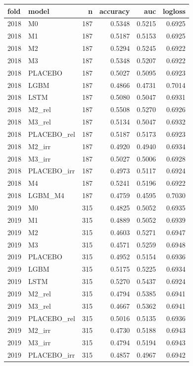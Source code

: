 \begin{tabular}{llrrrr}
\toprule
fold & model & n & accuracy & auc & logloss \\
\midrule
2018 & M0 & 187 & 0.5348 & 0.5215 & 0.6925 \\
2018 & M1 & 187 & 0.5187 & 0.5153 & 0.6925 \\
2018 & M2 & 187 & 0.5294 & 0.5245 & 0.6922 \\
2018 & M3 & 187 & 0.5348 & 0.5207 & 0.6922 \\
2018 & PLACEBO & 187 & 0.5027 & 0.5095 & 0.6923 \\
2018 & LGBM & 187 & 0.4866 & 0.4731 & 0.7014 \\
2018 & LSTM & 187 & 0.5080 & 0.5047 & 0.6931 \\
2018 & M2\_rel & 187 & 0.5508 & 0.5270 & 0.6926 \\
2018 & M3\_rel & 187 & 0.5134 & 0.5047 & 0.6932 \\
2018 & PLACEBO\_rel & 187 & 0.5187 & 0.5173 & 0.6923 \\
2018 & M2\_irr & 187 & 0.4920 & 0.4940 & 0.6934 \\
2018 & M3\_irr & 187 & 0.5027 & 0.5006 & 0.6928 \\
2018 & PLACEBO\_irr & 187 & 0.4973 & 0.5117 & 0.6924 \\
2018 & M4 & 187 & 0.5241 & 0.5196 & 0.6922 \\
2018 & LGBM\_M4 & 187 & 0.4759 & 0.4595 & 0.7030 \\
2019 & M0 & 315 & 0.4825 & 0.5052 & 0.6935 \\
2019 & M1 & 315 & 0.4889 & 0.5052 & 0.6939 \\
2019 & M2 & 315 & 0.4603 & 0.5271 & 0.6947 \\
2019 & M3 & 315 & 0.4571 & 0.5259 & 0.6948 \\
2019 & PLACEBO & 315 & 0.4952 & 0.5154 & 0.6936 \\
2019 & LGBM & 315 & 0.5175 & 0.5225 & 0.6934 \\
2019 & LSTM & 315 & 0.5270 & 0.5437 & 0.6924 \\
2019 & M2\_rel & 315 & 0.4794 & 0.5385 & 0.6941 \\
2019 & M3\_rel & 315 & 0.4667 & 0.5362 & 0.6941 \\
2019 & PLACEBO\_rel & 315 & 0.5016 & 0.5135 & 0.6936 \\
2019 & M2\_irr & 315 & 0.4730 & 0.5188 & 0.6943 \\
2019 & M3\_irr & 315 & 0.4794 & 0.5194 & 0.6943 \\
2019 & PLACEBO\_irr & 315 & 0.4857 & 0.4967 & 0.6942 \\

\end{tabular}
